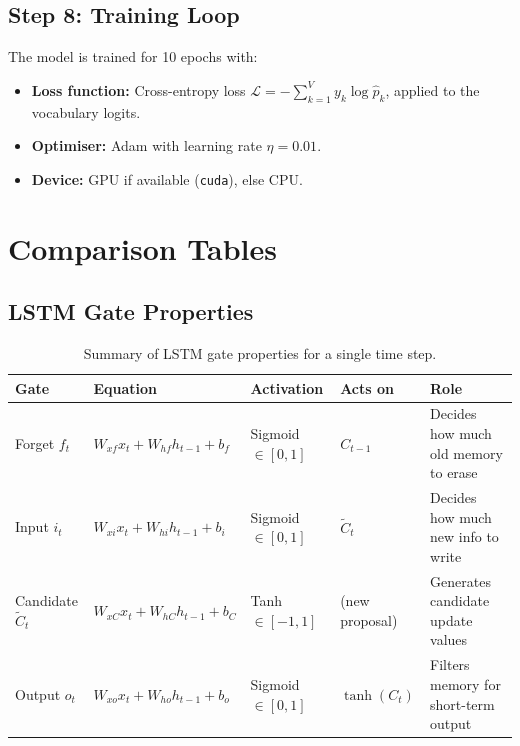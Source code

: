 \documentclass[12pt,a4paper]{article}
\begin{document}
\subsection{Step 8: Training Loop}
\label{subsec:training}

The model is trained for 10 epochs with:
\begin{itemize}
  \item \textbf{Loss function:} Cross-entropy loss
    $\mathcal{L} = -\sum_{k=1}^{V} y_k \log \hat{p}_k$, applied to the
    vocabulary logits.
  \item \textbf{Optimiser:} Adam with learning rate $\eta = 0.01$.
  \item \textbf{Device:} GPU if available (\texttt{cuda}), else CPU.
\end{itemize}

\newpage
\section{Comparison Tables}
\label{sec:tables}

\subsection{LSTM Gate Properties}
\label{subsec:gate-table}

\begin{table}[ht]
\centering
\caption{Summary of LSTM gate properties for a single time step.}
\label{tab:gate-props}
\begin{tabularx}{\textwidth}{lXXXX}
\toprule
\textbf{Gate}    & \textbf{Equation}
                 & \textbf{Activation}
                 & \textbf{Acts on}
                 & \textbf{Role} \\
\midrule
Forget $f_t$
  & $W_{xf}x_t + W_{hf}h_{t-1} + b_f$
  & Sigmoid $\in [0,1]$
  & $C_{t-1}$
  & Decides how much old memory to erase \\[4pt]
Input $i_t$
  & $W_{xi}x_t + W_{hi}h_{t-1} + b_i$
  & Sigmoid $\in [0,1]$
  & $\tilde{C}_t$
  & Decides how much new info to write \\[4pt]
Candidate $\tilde{C}_t$
  & $W_{xC}x_t + W_{hC}h_{t-1} + b_C$
  & Tanh $\in [-1,1]$
  & (new proposal)
  & Generates candidate update values \\[4pt]
Output $o_t$
  & $W_{xo}x_t + W_{ho}h_{t-1} + b_o$
  & Sigmoid $\in [0,1]$
  & $\tanh(C_t)$
  & Filters memory for short-term output \\
\bottomrule
\end{tabularx}
\end{table}
\end{document}
